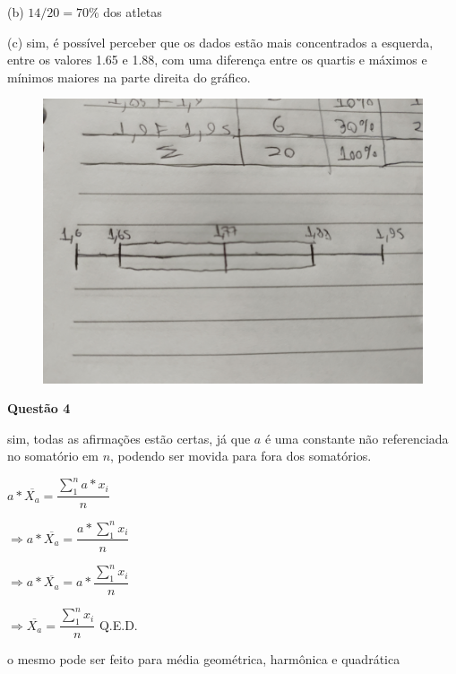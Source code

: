 \documentclass[12pt]{article}   %
\begin{document}
\par (b) $14/20 = 70\%$ dos atletas
\par (c) sim, é possível perceber que os dados estão mais concentrados a esquerda, entre os valores 1.65 e 1.88, com uma diferença entre os quartis e máximos e mínimos maiores na parte direita do gráfico.
	\begin{figure}[h!]
		\includegraphics[scale=0.03]{q3c}
	\end{figure}
\vspace{+12pt}
\par \textbf{Questão 4}
\vspace{+12pt}
\par sim, todas as afirmações estão certas, já que $a$ é uma constante não referenciada no somatório em $n$, podendo ser movida para fora dos somatórios.
\vspace{+6pt}
\par $a*\overline{X_a} = \dfrac{\sum_{1}^{n}a*x_i}{n}$
\vspace{+6pt}
\par $\Rightarrow a*\overline{X_a} = \dfrac{a*\sum_{1}^{n}x_i}{n}$
\vspace{+6pt}
\par $\Rightarrow a*\overline{X_a} = a *  \dfrac{\sum_{1}^{n}x_i}{n}$
\vspace{+6pt}
\par $\Rightarrow \overline{X_a} = \dfrac{\sum_{1}^{n}x_i}{n}$ Q.E.D.
\vspace{+6pt}
\par o mesmo pode ser feito para média geométrica, harmônica e quadrática
\vspace{+12pt}
\end{document}
